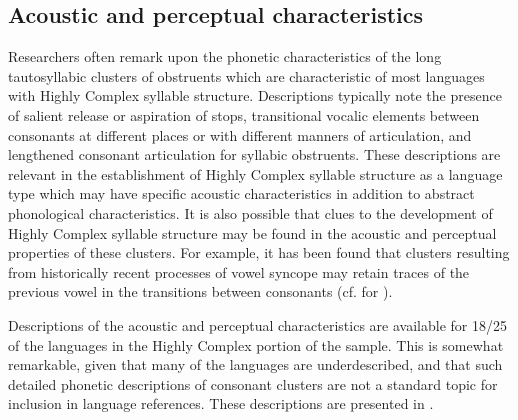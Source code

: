 \subsection{Acoustic and perceptual characteristics}\label{sec:3.4.3}

  Researchers often remark upon the phonetic characteristics of the long tautosyllabic clusters of obstruents which are characteristic of most languages with Highly Complex syllable structure. Descriptions typically note the presence of salient release or aspiration of stops, transitional vocalic elements between consonants at different places or with different manners of articulation, and lengthened consonant articulation for syllabic obstruents. These descriptions are relevant in the establishment of Highly Complex syllable structure as a language type which may have specific acoustic characteristics in addition to abstract phonological characteristics. It is also possible that clues to the development of Highly Complex syllable structure may be found in the acoustic and perceptual properties of these clusters. For example, it has been found that clusters resulting from historically recent processes of vowel syncope may retain traces of the previous vowel in the transitions between consonants (cf. \citealt{ChitoranBabaliyeva2007} for ).

  Descriptions of the acoustic and perceptual characteristics are available for 18/25 of the languages in the Highly Complex portion of the sample. This is somewhat remarkable, given that many of the languages are underdescribed, and that such detailed phonetic descriptions of consonant clusters are not a standard topic for inclusion in language references. These descriptions are presented in .


